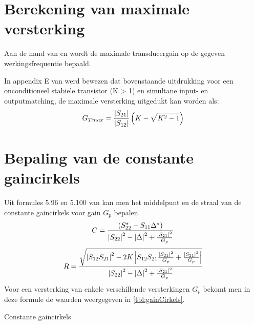   

\section{Berekening van maximale versterking}
  Aan de hand van \cite{Pozar} en \cite{Gonzalez} wordt de maximale transducergain
  op de gegeven werkingsfrequentie bepaald.
  
  In appendix E van \cite{Gonzalez} werd bewezen dat bovenstaande uitdrukking
  voor een onconditioneel stabiele transistor (K > 1) en simultane input- en
  outputmatching, de maximale versterking uitgedukt
  kan worden als:
  \[
    G_{Tmax} = \frac{\left| S_{21} \right|}{\left| S_{12} \right|} \left( K - \sqrt{K^2-1}\right)
  \]
  
  
  \section{Bepaling van de constante gaincirkels}
  Uit formules 5.96 en 5.100 van \cite{lessen} kan men het middelpunt en de
  straal van de constante gaincirkels voor gain $G_p$ bepalen.
  \[
    C = \frac{\left( S_{22}^{\star} - S_{11} \Delta^{\star} \right)}{\left| S_{22} \right|^2 - \left| \Delta \right|^2 + \frac{\left| S_{21} \right|^ 2}{G_p}}
  \]
  \[
    R = \frac{\sqrt{\left| S_{12} S_{21} \right|^2 - 2 K \left| S_{12} S_{21} \frac{\left| S_{21} \right|^2}{G_p} + \frac{\left| S_{21} \right|^2}{G_p}  \right|}}{\left| S_{22} \right|^2 - \left| \Delta \right|^2 + \frac{\left| S_{21} \right|^2}{G_p}}
  \]
  Voor een versterking van enkele verschillende versterkingen $G_p$ bekomt men
  in deze formule de waarden weergegeven in \autoref{tbl:gainCirkels}.
    \begin{table}[h!]
    \begin{center}
    \caption{Constante gaincirkels}
    \label{tbl:gainCirkels}
    
    \end{center}
    \end{table}
  
